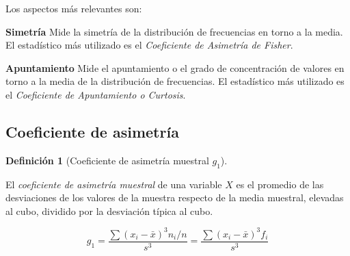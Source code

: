 \documentclass[
  spanish,
  a4paper,
]{scrreport}
\theoremstyle{plain}
\theoremstyle{definition}
\theoremstyle{definition}
\newtheorem{definition}{Definición}[chapter]
\theoremstyle{remark}
\begin{document}
Los aspectos más relevantes son:

\textbf{Simetría} Mide la simetría de la distribución de frecuencias en
torno a la media. El estadístico más utilizado es el \emph{Coeficiente
de Asimetría de Fisher}.

\textbf{Apuntamiento} Mide el apuntamiento o el grado de concentración
de valores en torno a la media de la distribución de frecuencias. El
estadístico más utilizado es el \emph{Coeficiente de Apuntamiento o
Curtosis}.

\subsection{Coeficiente de asimetría}\label{coeficiente-de-asimetruxeda}

\begin{definition}[Coeficiente de asimetría muestral
\(g_1\)]\protect\hypertarget{def-coeficiente-asimetria}{}\label{def-coeficiente-asimetria}

El \emph{coeficiente de asimetría muestral} de una variable \(X\) es el
promedio de las desviaciones de los valores de la muestra respecto de la
media muestral, elevadas al cubo, dividido por la desviación típica al
cubo.

\[g_1 = \frac{\sum (x_i-\bar x)^3 n_i/n}{s^3} = \frac{\sum (x_i-\bar x)^3 f_i}{s^3}\]

\end{definition}
\end{document}
